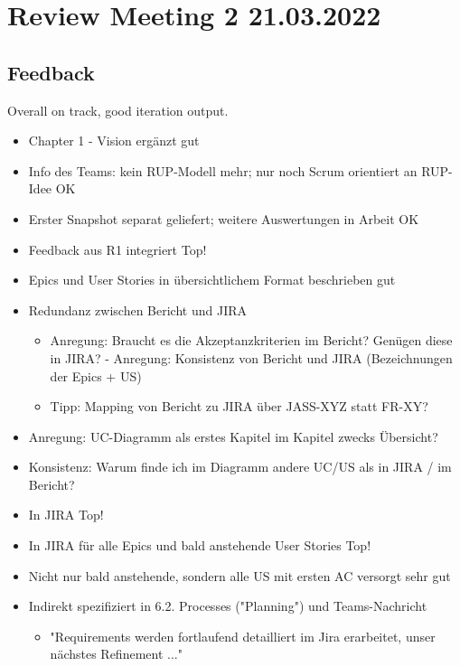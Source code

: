 \section{Review Meeting 2 21.03.2022}

\subsection{Feedback}
Overall on track, good iteration output.

\begin{itemize}
    \item Chapter 1 - Vision ergänzt \textrightarrow gut
    \item Info des Teams: kein RUP-Modell mehr; nur noch Scrum orientiert an RUP-Idee \textrightarrow OK
    \item Erster Snapshot separat geliefert; weitere Auswertungen in Arbeit \textrightarrow OK
    \item Feedback aus R1 integriert \textrightarrow Top!
    \item Epics und User Stories in übersichtlichem Format beschrieben \textrightarrow gut
    \item Redundanz zwischen Bericht und JIRA
    \begin{itemize}
        \item Anregung: Braucht es die Akzeptanzkriterien im Bericht? Genügen diese in JIRA? - Anregung: Konsistenz von Bericht und JIRA (Bezeichnungen der Epics + US)
        \item Tipp: Mapping von Bericht zu JIRA über JASS-XYZ statt FR-XY?
    \end{itemize}
    \item Anregung: UC-Diagramm als erstes Kapitel im Kapitel zwecks Übersicht?
    \item Konsistenz: Warum finde ich im Diagramm andere UC/US als in JIRA / im Bericht?
    \item In JIRA \textrightarrow Top!
    \item In JIRA für alle Epics und bald anstehende User Stories \textrightarrow Top!
    \item Nicht nur bald anstehende, sondern alle US mit ersten AC versorgt \textrightarrow sehr gut
    \item Indirekt spezifiziert in 6.2. Processes ("Planning") und Teams-Nachricht
    \begin{itemize}
        \item "Requirements werden fortlaufend detailliert im Jira erarbeitet, unser nächstes Refinement ..."

\end{itemize}
\end{itemize}
